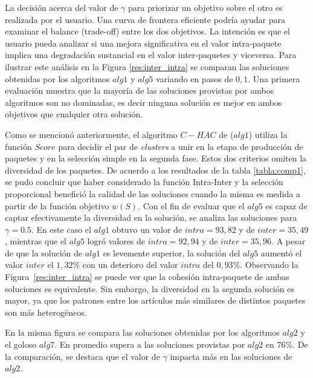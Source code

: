 La decisión acerca del valor de $\gamma$ para priorizar un objetivo sobre el otro es realizada por el usuario. Una curva de frontera eficiente podría ayudar para examinar el balance (trade-off) entre los dos objetivos. La intención es que el usuario pueda analizar si una mejora significativa en el valor intra-paquete implica una degradación sustancial en el valor inter-paquetes y viceversa. Para ilustrar este análisis en la Figura \ref{res:inter_intra} se comparan las soluciones obtenidas por los algoritmos $alg1$ y $alg5$ variando en pasos de $0,1$. Una primera evaluación muestra que la mayoría de las soluciones provistas por ambos algoritmos son no dominadas, es decir ninguna solución es mejor en ambos objetivos que cualquier otra solución.

Como se mencionó anteriormente, el algoritmo $C-HAC$ de \cite{journals/tkde/Amer-YahiaBCFMZ14} ($alg1$) utiliza la función $Score$ para decidir el par de {\em clusters} a unir en la etapa de producción de paquetes y en la selección simple en la segunda fase. Estos dos criterios omiten la diversidad de los paquetes. De acuerdo a los resultados de la tabla \ref{tabla:comp1}, se pudo concluir que haber considerado la función Intra-Inter y la selección proporcional benefició la calidad de las soluciones cuando la misma es medida a partir de la función objetivo $w(S)$. Con el fin de evaluar que el $alg5$ es capaz de captar efectivamente la diversidad en la solución, se analiza las soluciones para $\gamma=0.5$. En este caso el $alg1$ obtuvo un valor de $intra=93,82$ y de $inter=35,49$, mientras que el $alg5$ logró valores de $intra=92,94$ y de $inter=35,96$. A pesar de que la solución de $alg1$ es levemente superior, la solución del $alg5$ aumentó el valor $inter$ el $1,32\%$ con un deterioro del valor $intra$ del $0,93\%$. Observando la Figura~\ref{res:inter_intra} se puede ver que la cohesión intra-paquete de ambas soluciones es equivalente. Sin embargo, la diversidad en la segunda solución es mayor, ya que los patrones entre los artículos más similares de distintos paquetes son más heterogéneos. 

En la misma figura se compara las soluciones obtenidas por los algoritmos $alg2$ y el goloso $alg7$. En promedio supera a las soluciones provistas por $alg2$ en $76\%$. De la comparación, se destaca que el valor de $\gamma$ impacta más en las soluciones de $alg2$.  

